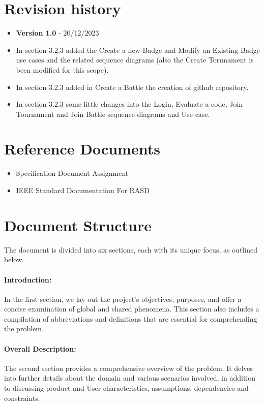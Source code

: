 \section{Revision history}
\label{sec:revision_history}%
\begin{itemize}
    \item \textbf{Version 1.0} - 20/12/2023
    \item In section 3.2.3 added the Create a new Badge and Modify an Existing Badge use cases and the related sequence diagrams (also the Create Torunament is been modified for this scope).
    \item In section 3.2.3 added in Create a Battle the creation of github repository.
    \item In section 3.2.3 some little changes into the Login, Evaluate a code, Join Tournament and Join Battle sequence diagrams and Use case.
\end{itemize}


\section{Reference Documents}
\label{sec:reference_documents}%
\begin{itemize}
    \item Specification Document Assignment
    \item IEEE Standard Documentation For RASD 
\end{itemize}

\newpage

\section{Document Structure}
\label{sec:document_structure}%
The document is divided into six sections, each with its unique focus, as outlined below.
\paragraph{Introduction:} In the first section, we lay out the project's objectives, purposes, and offer a concise examination of global and shared phenomena. This section also includes a compilation of abbreviations and definitions that are essential for comprehending the problem.
\paragraph{Overall Description:} The second section provides a comprehensive overview of the problem. It delves into further details about the domain and various scenarios involved, in addition to discussing product and User characteristics, assumptions, dependencies and constraints.
